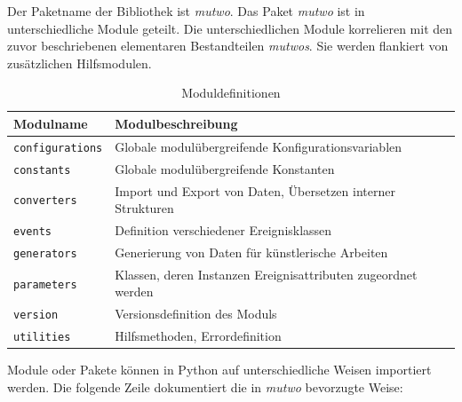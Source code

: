 \documentclass[12pt,a4paper,ngerman]{article}
\begin{document}
\bigskip

Der Paketname der Bibliothek ist \emph{mutwo}.
% 
% 
% 
Das Paket \emph{mutwo} ist in unterschiedliche Module geteilt.
Die unterschiedlichen Module korrelieren mit den zuvor beschriebenen elementaren Bestandteilen \emph{mutwos}.
Sie werden flankiert von zusätzlichen Hilfsmodulen.

\begin{table}[h!]
    \begin{center}
        \begin{tabular}{l l} 
            \hline
            Modulname & Modulbeschreibung \\ [0.5ex] 
            \hline\hline
            \texttt{configurations} & Globale modulübergreifende Konfigurationsvariablen \\
            \texttt{constants} & Globale modulübergreifende Konstanten \\
            \texttt{converters} & Import und Export von Daten, Übersetzen interner Strukturen \\
            \texttt{events} & Definition verschiedener Ereignisklassen \\
            \texttt{generators} & Generierung von Daten für künstlerische Arbeiten \\
            \texttt{parameters} & Klassen, deren Instanzen Ereignisattributen zugeordnet werden \\
            \texttt{version} & Versionsdefinition des Moduls \\
            \texttt{utilities} & Hilfsmethoden, Errordefinition \\ [1ex] 
            \hline
        \end{tabular}\label{table:modulDefinition}
    \end{center}

    \caption{Moduldefinitionen}
\end{table}

Module oder Pakete können in Python auf unterschiedliche Weisen importiert werden.
Die folgende Zeile dokumentiert die in \emph{mutwo} bevorzugte Weise:
\end{document}
